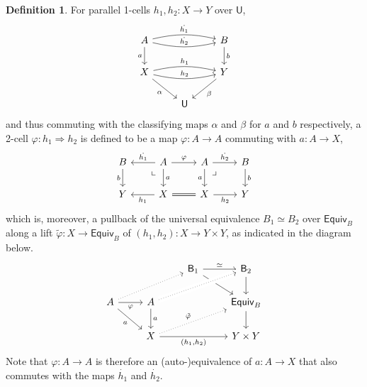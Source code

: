 \documentclass[12pt,reqno]{amsart}
\renewcommand{\to}{\ensuremath{\rightarrow}}
\newcommand{\T}{\ensuremath{\mathsf{U}}}
\newcommand{\pbcorner}{\arrow[dr,phantom,"\lrcorner" very near start, shift right=.5ex]} %
\newcommand{\pbcornerright}{\arrow[dl,phantom,"\llcorner" very near start, shift left=.5ex]} %
\theoremstyle{remark}
\theoremstyle{definition}
\newtheorem{definition}[theorem]{Definition}
\begin{document}
%
\begin{definition}\label{def:2cells}%
For parallel 1-cells $h_1, h_2 : X \to Y$ over $\T$,
\begin{equation}\label{eq:parallelclassifiedfamilies}
\begin{tikzcd}
	 A \ar[d,swap, "a"] \ar[rr,bend right = 3ex, "{\dot{h_2}}"]  \ar[rr,bend left  = 3ex, "{\dot{h_1}}"]  && B \ar[d, "b"] \\  
	 X \ar[rr,swap,bend right = 3ex,swap, "{h_2}"] \ar[rr,bend left  = 3ex, "{h_1}"]  \ar[rd,swap, "\alpha"] &&  \ar[ld, "\beta"]  Y\\
	&\T&
 \end{tikzcd}
 \end{equation}
and thus commuting with the classifying maps $\alpha$ and $\beta$ for $a$ and $b$ respectively, a 2-cell $\varphi : h_1 \Rightarrow h_2$ is defined to be a map $\varphi : A\to A$ commuting with $a : A \to X$,
\begin{equation}\label{eq:parallelclassifiedfamilies2}
\begin{tikzcd}
 B  \ar[d,swap, "b"] &  \ar[l,swap, "{\dot{h_1}}"] A \ar[r, "{\varphi}"] \ar[d, "a"] \pbcornerright & A \ar[d, swap, "a"]  \ar[r, "{\dot{h_2}}"]   \pbcorner & B \ar[d, "b"] \\  
 Y &  \ar[l, "{h_1}"]  X \ar[r, equals] & X \ar[r,swap, "{h_2}"] &  Y
 \end{tikzcd}
 \end{equation}
which is, moreover, a pullback of the universal equivalence $B_1\simeq B_2$ over $\mathsf{Equiv}_B$ along a lift $\tilde{\varphi} : X \to \mathsf{Equiv}_B$ of  $(h_1, h_2) : X \to Y \times Y$, as indicated in the diagram below.
\begin{equation}\label{diag:2celldef3}
\begin{tikzcd} 
	&& \mathsf{B}_1 \ar[rd]  \ar[r,"{\simeq}"]  & \mathsf{B}_2 \ar[d] \\  
A \ar[rd,swap, "a"] \ar[r,swap, "{\varphi}"]  \ar[rru, dotted] & A \ar[d, "a"] \ar[rru, crossing over, dotted] && \mathsf{Equiv}_B \ar[d] \\  
& X \ar[rru, dotted, "{\tilde{\varphi}}"] \ar[rr, swap, "{(h_1, h_2)}"] && Y \times Y
	 \end{tikzcd}
 \end{equation}
 Note that $\varphi : A \to A$ is therefore an (auto-)equivalence of $a :A\to X$ that also commutes with the maps $\dot{h_1}$ and $\dot{h_2}$.  
\end{definition}
\end{document}
